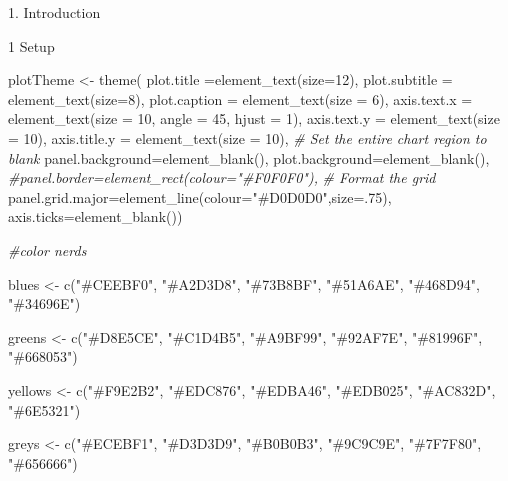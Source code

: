 \documentclass[
  ignorenonframetext,
]{beamer}
\newenvironment{Shaded}{\begin{snugshade}}{\end{snugshade}}
\newcommand{\AttributeTok}[1]{\textcolor[rgb]{0.77,0.63,0.00}{#1}}
\newcommand{\CommentTok}[1]{\textcolor[rgb]{0.56,0.35,0.01}{\textit{#1}}}
\newcommand{\DecValTok}[1]{\textcolor[rgb]{0.00,0.00,0.81}{#1}}
\newcommand{\FunctionTok}[1]{\textcolor[rgb]{0.00,0.00,0.00}{#1}}
\newcommand{\NormalTok}[1]{#1}
\newcommand{\OtherTok}[1]{\textcolor[rgb]{0.56,0.35,0.01}{#1}}
\newcommand{\StringTok}[1]{\textcolor[rgb]{0.31,0.60,0.02}{#1}}
\begin{document}
\begin{frame}[fragile]{1. Introduction}
\begin{block}{1 Setup}
\begin{Shaded}
\begin{Highlighting}[]
\NormalTok{plotTheme }\OtherTok{\textless{}{-}} \FunctionTok{theme}\NormalTok{(}
  \AttributeTok{plot.title =}\FunctionTok{element\_text}\NormalTok{(}\AttributeTok{size=}\DecValTok{12}\NormalTok{),}
  \AttributeTok{plot.subtitle =} \FunctionTok{element\_text}\NormalTok{(}\AttributeTok{size=}\DecValTok{8}\NormalTok{),}
  \AttributeTok{plot.caption =} \FunctionTok{element\_text}\NormalTok{(}\AttributeTok{size =} \DecValTok{6}\NormalTok{),}
  \AttributeTok{axis.text.x =} \FunctionTok{element\_text}\NormalTok{(}\AttributeTok{size =} \DecValTok{10}\NormalTok{, }\AttributeTok{angle =} \DecValTok{45}\NormalTok{, }\AttributeTok{hjust =} \DecValTok{1}\NormalTok{),}
  \AttributeTok{axis.text.y =} \FunctionTok{element\_text}\NormalTok{(}\AttributeTok{size =} \DecValTok{10}\NormalTok{),}
  \AttributeTok{axis.title.y =} \FunctionTok{element\_text}\NormalTok{(}\AttributeTok{size =} \DecValTok{10}\NormalTok{),}
  \CommentTok{\# Set the entire chart region to blank}
  \AttributeTok{panel.background=}\FunctionTok{element\_blank}\NormalTok{(),}
  \AttributeTok{plot.background=}\FunctionTok{element\_blank}\NormalTok{(),}
  \CommentTok{\#panel.border=element\_rect(colour="\#F0F0F0"),}
  \CommentTok{\# Format the grid}
  \AttributeTok{panel.grid.major=}\FunctionTok{element\_line}\NormalTok{(}\AttributeTok{colour=}\StringTok{"\#D0D0D0"}\NormalTok{,}\AttributeTok{size=}\NormalTok{.}\DecValTok{75}\NormalTok{),}
  \AttributeTok{axis.ticks=}\FunctionTok{element\_blank}\NormalTok{())}

\CommentTok{\#color nerds}

\NormalTok{blues }\OtherTok{\textless{}{-}} \FunctionTok{c}\NormalTok{(}\StringTok{"\#CEEBF0"}\NormalTok{, }\StringTok{"\#A2D3D8"}\NormalTok{, }\StringTok{"\#73B8BF"}\NormalTok{, }\StringTok{"\#51A6AE"}\NormalTok{, }\StringTok{"\#468D94"}\NormalTok{, }\StringTok{"\#34696E"}\NormalTok{)}

\NormalTok{greens }\OtherTok{\textless{}{-}} \FunctionTok{c}\NormalTok{(}\StringTok{"\#D8E5CE"}\NormalTok{, }\StringTok{"\#C1D4B5"}\NormalTok{, }\StringTok{"\#A9BF99"}\NormalTok{, }\StringTok{"\#92AF7E"}\NormalTok{, }\StringTok{"\#81996F"}\NormalTok{, }\StringTok{"\#668053"}\NormalTok{)}

\NormalTok{yellows }\OtherTok{\textless{}{-}} \FunctionTok{c}\NormalTok{(}\StringTok{"\#F9E2B2"}\NormalTok{, }\StringTok{"\#EDC876"}\NormalTok{, }\StringTok{"\#EDBA46"}\NormalTok{, }\StringTok{"\#EDB025"}\NormalTok{, }\StringTok{"\#AC832D"}\NormalTok{, }\StringTok{"\#6E5321"}\NormalTok{)}

\NormalTok{greys }\OtherTok{\textless{}{-}} \FunctionTok{c}\NormalTok{(}\StringTok{"\#ECEBF1"}\NormalTok{, }\StringTok{"\#D3D3D9"}\NormalTok{, }\StringTok{"\#B0B0B3"}\NormalTok{, }\StringTok{"\#9C9C9E"}\NormalTok{, }\StringTok{"\#7F7F80"}\NormalTok{, }\StringTok{"\#656666"}\NormalTok{)}


\end{Highlighting}
\end{Shaded}
\end{block}
\end{frame}
\end{document}
